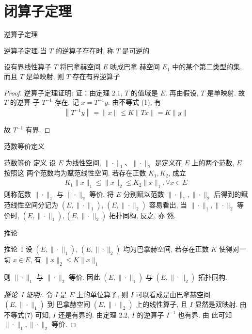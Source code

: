 \documentclass[sans,mathserif]{beamer} %
\begin{document}
\section{闭算子定理}
\begin{frame}{逆算子定理}
\begin{theorem}{逆算子定理}
	当 $T$ 的逆算子存在时, 称 $T$ 是可逆的

	设有界线性算子 $T$ 将巴拿赫空间 $E$ 映成巴拿
赫空间 $E_1$ 中的某个第二类型的集, 而且 $T$ 是单映射, 则 $T$ 存在有界逆算子

\end{theorem}
\begin{proof}{逆算子定理证明:}
	证：由定理 2.1, $ T $ 的值域是 $ E $.  再由假设,  $T $ 是单映射. 故 $ T $ 的逆算
	子 $ T^{-1} $ 存在.
	记 $ x=T^{-1} y $.  由不等式  (1),  有
	\begin{align*}
		\left\|T^{-1} y\right\|=\|x\| \leq K\|T x\|=K\|y\|
	\end{align*}
	
	故  $T^{-1} $ 有界.
	
\end{proof}
\end{frame}

\begin{frame}{范数等价定义}
\begin{definition}{范数等价}
	定义 设 $ E $ 为线性空间, $ \|\cdot\|_{1} $、$\|\cdot\|_{2}$  是定义在 $ E $ 上的两个范数, $ E $ 按照这 两个范数均为赋范线性空间.
若存在正数 $ K_{1}, K_{2}$,  成立
\begin{align*}
	K_{1}\|x\|_{1} \leq\|x\|_{2} \leq K_{2}\|x\|_{1}, \forall x \in E
\end{align*}
则称范数 $\|  \cdot \|_{1}$  与  $\|\cdot\|_{2}$  等价.
将 $ E $ 分别赋以范数  $\|\cdot\|_{1},\|\cdot\|_{2}$  后得到的赋范线性空间分记为  $\left(E,\|\cdot\|_{1}\right)$,  $\left(E,\|\cdot\|_{2}\right) $
容易看出, 当  $\|\cdot\|_{1},\|\cdot\|_{2}$ 等价时,  $\left(E,\|\cdot\|_{1}\right),\left(E,\|\cdot\|_{2}\right)$  拓扑同构, 反之, 亦
然.
\end{definition}	
\end{frame}

\begin{frame}{推论}
	\begin{alertblock}{推论~I}
		设 $ \left(E,\|\cdot\|_{1}\right)$, $\left(E,\|\cdot\|_{2}\right)$  均为巴拿赫空间,
若存在正数 $ K $ 使得对一切 $ x \in E$,  有
$\|x\|_{2} \leq K\|x\|_{1}$	

则 $ \|\cdot\|_{1} $ 与 $ \|\cdot\|_{2}$  等价. 因此  $\left(E,\|\cdot\|_{1}\right) $ 与  $\left(E,\|\cdot\|_{2}\right) $ 拓扑同构.
\end{alertblock}
\begin{proof}[推论~I 证明:]
	令 $ I $ 是 $ E $ 上的单位算子, 则 $ I $ 可以看成是由巴拿赫空间 $ \left(E,\|\cdot\|_{1}\right) $ 到 巴拿赫空间 $ \left(E,\|\cdot\|_{2}\right) $ 上的线性算子, 且 $ I $ 显然是双映射.
由不等式(7) 可知, $ I $ 还是有界的. 由定理 2.2, $ I $ 的逆算子 $ I^{-1} $ 也有界. 由
此可知 $ \|\cdot\|_{1},\|\cdot\|_{2} $ 等价.
\end{proof}	
\end{frame}
\end{document}
